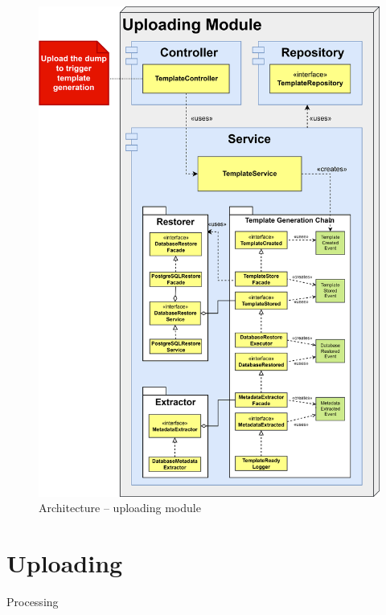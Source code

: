 \documentclass[a4paper,twoside,12pt]{book}
\begin{document}
\begin{itemize}
\begin{figure}
  \centering
  \includegraphics[width=\linewidth]{img/architecture_uploading.png}
  \caption{Architecture – uploading module}
  \label{fig:architecture_uploading}
\end{figure}

\section{Uploading}

Processing


\end{itemize}
\end{document}
